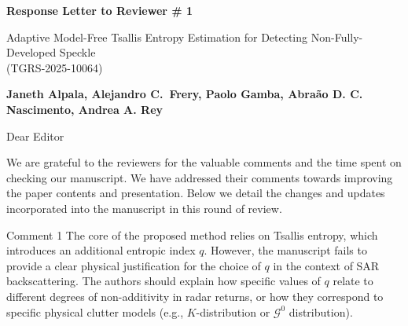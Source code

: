 \documentclass[11pt]{report}
\begin{document}
\begin{center}
\large{\textbf{Response Letter to Reviewer \# 1}}

\vglue 0.3cm

\huge{ Adaptive Model-Free Tsallis Entropy Estimation for Detecting Non-Fully-Developed Speckle\\ (TGRS-2025-10064)}
\end{center}

\begin{center}
\textbf{Janeth Alpala,  Alejandro C.\ Frery, Paolo Gamba, Abraão D. C. Nascimento, Andrea A. Rey }
\end{center}

\date{\today}



\vspace{0.5cm}
\noindent Dear Editor
\bigskip

\noindent We are grateful to the reviewers for the valuable comments and the time spent on checking our manuscript. 
We have addressed their comments towards improving the paper contents and presentation. 
Below we detail the changes and updates incorporated into the manuscript in this round of review.

\medskip

\begin{reviewbox}{Comment 1 }
The core of the proposed method relies on Tsallis entropy, which introduces an additional entropic index $q$. However, the manuscript fails to provide a clear physical justification for the choice of $q$ in the context of SAR backscattering. The authors should explain how specific values of $q$ relate to different degrees of non-additivity in radar returns, or how they correspond to specific physical clutter models (e.g., $K$-distribution or $\mathcal{G}^{0}$ distribution).
\end{reviewbox}
\end{document}
